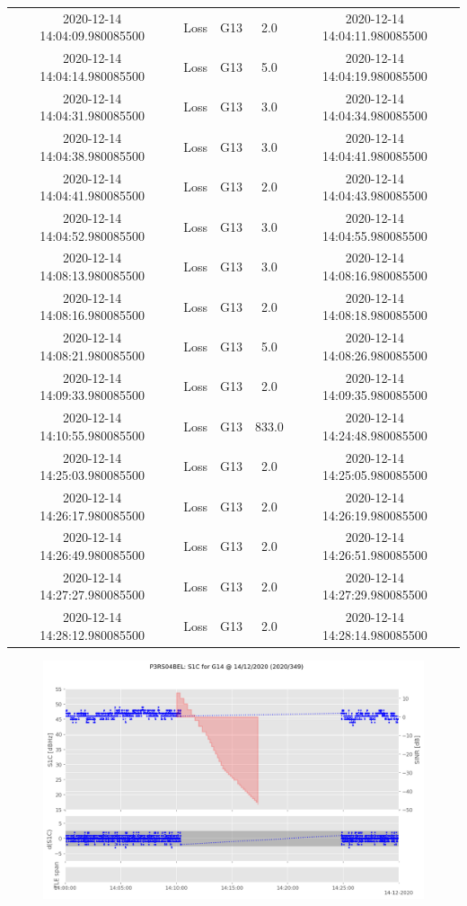 \begin{enumerate}
\begin{longtabu}{ccccc}
2020{-}12{-}14 14:04:09.980085500&Loss&G13&2.0&2020{-}12{-}14 14:04:11.980085500\\%
2020{-}12{-}14 14:04:14.980085500&Loss&G13&5.0&2020{-}12{-}14 14:04:19.980085500\\%
2020{-}12{-}14 14:04:31.980085500&Loss&G13&3.0&2020{-}12{-}14 14:04:34.980085500\\%
2020{-}12{-}14 14:04:38.980085500&Loss&G13&3.0&2020{-}12{-}14 14:04:41.980085500\\%
2020{-}12{-}14 14:04:41.980085500&Loss&G13&2.0&2020{-}12{-}14 14:04:43.980085500\\%
2020{-}12{-}14 14:04:52.980085500&Loss&G13&3.0&2020{-}12{-}14 14:04:55.980085500\\%
2020{-}12{-}14 14:08:13.980085500&Loss&G13&3.0&2020{-}12{-}14 14:08:16.980085500\\%
2020{-}12{-}14 14:08:16.980085500&Loss&G13&2.0&2020{-}12{-}14 14:08:18.980085500\\%
2020{-}12{-}14 14:08:21.980085500&Loss&G13&5.0&2020{-}12{-}14 14:08:26.980085500\\%
2020{-}12{-}14 14:09:33.980085500&Loss&G13&2.0&2020{-}12{-}14 14:09:35.980085500\\%
2020{-}12{-}14 14:10:55.980085500&Loss&G13&833.0&2020{-}12{-}14 14:24:48.980085500\\%
2020{-}12{-}14 14:25:03.980085500&Loss&G13&2.0&2020{-}12{-}14 14:25:05.980085500\\%
2020{-}12{-}14 14:26:17.980085500&Loss&G13&2.0&2020{-}12{-}14 14:26:19.980085500\\%
2020{-}12{-}14 14:26:49.980085500&Loss&G13&2.0&2020{-}12{-}14 14:26:51.980085500\\%
2020{-}12{-}14 14:27:27.980085500&Loss&G13&2.0&2020{-}12{-}14 14:27:29.980085500\\%
2020{-}12{-}14 14:28:12.980085500&Loss&G13&2.0&2020{-}12{-}14 14:28:14.980085500\\%
\hline%
\end{longtabu}%


\begin{figure}[H]%
\centering%
\includegraphics[width=0.95\linewidth]{png/P3RS04BEL_R_20203490000_01D_00U_MO_G-S1C-G14.png}%
\end{figure}


\end{enumerate}

